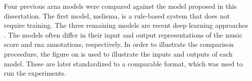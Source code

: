 
Four previous \gls{arna} models were compared against the
model proposed in this dissertation. The first model,
\gls{melisma}, is a rule-based system that does not require
training. The three remaining models are recent deep
learning approaches \parencite{chen2021attend,
micchi2021deep, mcleod2021modular}. The models often differ
in their input and output representations of the music score
and \gls{rna} annotations, respectively. In order to
illustrate the comparison proceedure, the figure on
 is used to illustrate
the inputs and outputs of each model. These are later
standardized to a comparable format, which was used to run
the experiments.

